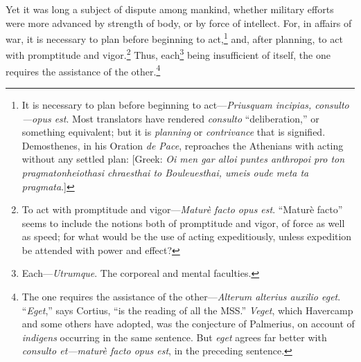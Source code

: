 Yet it was long a subject of dispute among mankind, whether military
efforts were more advanced by strength of body, or by force of
intellect. For, in affairs of war, it is necessary to plan before
beginning to act,\footnote{It is necessary to plan before beginning to act—\emph{Priusquam
incipias, consulto—opus est}. Most translators have rendered
\emph{consulto} ``deliberation,'' or something equivalent; but it is
\emph{planning} or \emph{contrivance} that is signified. Demosthenes, in his
Oration \emph{de Pace}, reproaches the Athenians with acting without any
settled plan: [Greek: \emph{Oi men gar alloi puntes anthropoi pro ton
pragmatonheiothasi chraesthai to Bouleuesthai, umeis oude meta ta
pragmata}.]} and, after planning, to act with promptitude
and vigor.\footnote{To act with promptitude and vigor—\emph{Maturè facto opus est}.
``Maturè facto'' seems to include the notions both of promptitude and
vigor, of force as well as speed; for what would be the use of acting
expeditiously, unless expedition be attended with power and effect?} Thus, each\footnote{Each—\emph{Utrumque}. The corporeal and mental faculties.} being insufficient of itself, the one
requires the assistance of the other.\footnote{The one requires the assistance of the other—\emph{Alterum
alterius auxilio eget}. ``\emph{Eget},'' says Cortius, ``is the reading of all
the MSS.'' \emph{Veget}, which Havercamp and some others have adopted, was
the conjecture of Palmerius, on account of \emph{indigens} occurring in the
same sentence. But \emph{eget} agrees far better with \emph{consulto et—maturè
facto opus est}, in the preceding sentence.}

